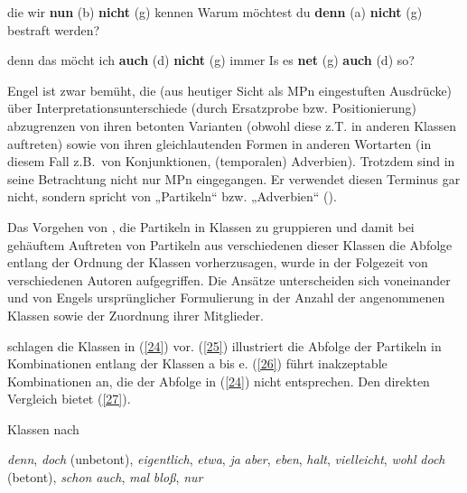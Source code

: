 \begin{exe}
	\ex\label{22} 
		\begin{xlist}	
			\ex\label{22a} die wir \textbf{nun} (b) \textbf{nicht} (g) kennen
			\ex\label{22b} Warum möchtest du \textbf{denn} (a) \textbf{nicht} (g) bestraft werden?
		\end{xlist}
\end{exe}

\begin{exe}
	\ex\label{23} 
		\begin{xlist}	
			\ex\label{23a} denn das möcht ich \textbf{auch} (d) \textbf{nicht} (g) immer
			\ex\label{23b} Is es \textbf{net} (g) \textbf{auch} (d) so?	
			\hfill\hbox{\citet[94]{Engel1968}}
		\end{xlist}
\end{exe}
Engel ist zwar bemüht, die (aus heutiger Sicht als MPn eingestuften Ausdrücke) über Interpretationsunterschiede (durch Ersatzprobe bzw. Positionierung) abzugrenzen von ihren betonten Varianten (obwohl diese z.T. in anderen Klassen auftreten) sowie von ihren gleichlautenden Formen in anderen Wortarten (in diesem Fall z.B.\ von Konjunktionen, (temporalen) Adverbien). Trotzdem sind in seine Betrachtung nicht nur MPn eingegangen. Er verwendet diesen Terminus gar nicht, sondern spricht von „Partikeln“ bzw. „Adverbien“ (\citealt[91/85]{Engel1968}). 

Das Vorgehen von \citet{Engel1968}, die Partikeln in Klassen zu gruppieren und damit bei gehäuftem Auftreten von Partikeln aus verschiedenen dieser Klassen die Abfolge entlang der Ordnung der Klassen vorherzusagen, wurde in der Folgezeit von verschiedenen Autoren aufgegriffen. Die Ansätze unterscheiden sich voneinander und von Engels ursprünglicher Formulierung in der Anzahl der angenommenen Klassen sowie der Zuordnung ihrer Mitglieder.

\citet{Helbig1981} schlagen die Klassen in (\ref{24}) vor. (\ref{25}) illustriert die Abfolge der Partikeln in Kombinationen entlang der Klassen a bis e. (\ref{26}) führt inakzep\-table Kombinationen an, die der Abfolge in (\ref{24}) nicht entsprechen. Den direkten Vergleich bietet (\ref{27}).

\begin{exe}
	\ex\label{24} 
	 Klassen nach \citet[41/42]{Helbig1981}
		\begin{xlist}	
			\ex\label{24a} \textit{denn}, \textit{doch} (unbetont), \textit{eigentlich}, \textit{etwa}, \textit{ja}
			\ex\label{24b} \textit{aber}, \textit{eben}, \textit{halt}, \textit{vielleicht}, \textit{wohl}
			\ex\label{24c} \textit{doch} (betont), \textit{schon}
			\ex\label{24d} \textit{auch}, \textit{mal}
			\ex\label{24e} \textit{bloß}, \textit{nur}
		\end{xlist}
\end{exe}

